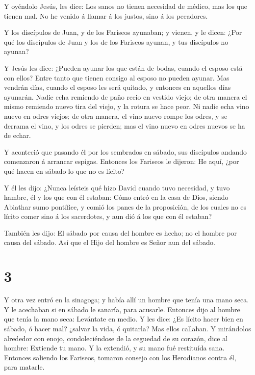  Y oyéndolo Jesús, les dice: Los sanos no tienen necesidad
de médico, mas los que tienen mal. No he venido á llamar á los justos,
sino á los pecadores.

 Y los discípulos de Juan, y de los Fariseos ayunaban; y
vienen, y le dicen: ¿Por qué los discípulos de Juan y los de los
Fariseos ayunan, y tus discípulos no ayunan?

 Y Jesús les dice: ¿Pueden ayunar los que están de bodas,
cuando el esposo está con ellos? Entre tanto que tienen consigo al
esposo no pueden ayunar.  Mas vendrán días, cuando el
esposo les será quitado, y entonces en aquellos días ayunarán.
 Nadie echa remiendo de paño recio en vestido viejo; de
otra manera el mismo remiendo nuevo tira del viejo, y la rotura se hace
peor.  Ni nadie echa vino nuevo en odres viejos; de otra
manera, el vino nuevo rompe los odres, y se derrama el vino, y los odres
se pierden; mas el vino nuevo en odres nuevos se ha de echar.

 Y aconteció que pasando él por los sembrados en sábado,
sus discípulos andando comenzaron á arrancar espigas. 
Entonces los Fariseos le dijeron: He aquí, ¿por qué hacen en sábado lo
que no es lícito?

 Y él les dijo: ¿Nunca leísteis qué hizo David cuando tuvo
necesidad, y tuvo hambre, él y los que con él estaban: 
Cómo entró en la casa de Dios, siendo Abiathar sumo pontífice, y comió
los panes de la proposición, de los cuales no es lícito comer sino á los
sacerdotes, y aun dió á los que con él estaban?

 También les dijo: El sábado por causa del hombre es hecho;
no el hombre por causa del sábado.  Así que el Hijo del
hombre es Señor aun del sábado.

\hypertarget{section-2}{%
\section{3}\label{section-2}}

 Y otra vez entró en la sinagoga; y había allí un hombre que
tenía una mano seca.  Y le acechaban si en sábado le
sanaría, para acusarle.  Entonces dijo al hombre que tenía
la mano seca: Levántate en medio.  Y les dice: ¿Es lícito
hacer bien en sábado, ó hacer mal? ¿salvar la vida, ó quitarla? Mas
ellos callaban.  Y mirándolos alrededor con enojo,
condoleciéndose de la ceguedad de su corazón, dice al hombre: Extiende
tu mano. Y la extendió, y su mano fué restituída sana. 
Entonces saliendo los Fariseos, tomaron consejo con los Herodianos
contra él, para matarle.

